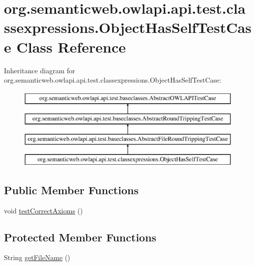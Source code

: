 \hypertarget{classorg_1_1semanticweb_1_1owlapi_1_1api_1_1test_1_1classexpressions_1_1_object_has_self_test_case}{\section{org.\-semanticweb.\-owlapi.\-api.\-test.\-classexpressions.\-Object\-Has\-Self\-Test\-Case Class Reference}
\label{classorg_1_1semanticweb_1_1owlapi_1_1api_1_1test_1_1classexpressions_1_1_object_has_self_test_case}
}
Inheritance diagram for org.\-semanticweb.\-owlapi.\-api.\-test.\-classexpressions.\-Object\-Has\-Self\-Test\-Case\-:\begin{figure}[H]
\begin{center}
\leavevmode
\includegraphics[height=4.000000cm]{classorg_1_1semanticweb_1_1owlapi_1_1api_1_1test_1_1classexpressions_1_1_object_has_self_test_case}
\end{center}
\end{figure}
\subsection*{Public Member Functions}
\begin{DoxyCompactItemize}
\item 
void \hyperlink{classorg_1_1semanticweb_1_1owlapi_1_1api_1_1test_1_1classexpressions_1_1_object_has_self_test_case_a7e3033a1f2b804c75554be4ec814b3bb}{test\-Correct\-Axioms} ()
\end{DoxyCompactItemize}
\subsection*{Protected Member Functions}
\begin{DoxyCompactItemize}
\item 
String \hyperlink{classorg_1_1semanticweb_1_1owlapi_1_1api_1_1test_1_1classexpressions_1_1_object_has_self_test_case_accf50d1cb91786e30fc5b9685da672b4}{get\-File\-Name} ()
\end{DoxyCompactItemize}


